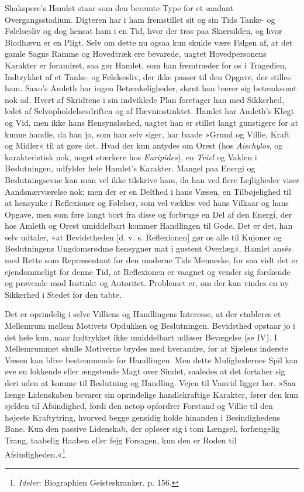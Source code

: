 \documentclass[12pt,a4paper,openany]{book}
\newcommand{\opage}[1]{\marginnote{\footnotesize\textit{[#1]}}}
\begin{document}
Shakspere’s Hamlet staar som den berømte Type for et saadant
Overgangsstadium. Digteren har i ham fremstillet sit og sin Tids Tanke-
og Følelsesliv og dog hensat ham i en Tid, hvor der tros paa Skærsilden,
og hvor Blodhævn er en Pligt.
\opage{393}Selv om dette nu ogsaa kun skulde være Følgen af, at det
gamle Sagns Ramme og Hovedtræk ere bevarede, uagtet Hovedpersonens
Karakter er forandret, saa gør Hamlet, som han fremtræder for os i
Tragedien, Indtrykket af et Tanke- og Følelsesliv, der ikke passer til
den Opgave, der stilles ham. Saxo’s Amleth har ingen Betænkeligheder,
skønt han bærer sig betænksomt nok ad. Hvert af Skridtene i sin
indviklede Plan foretager han med Sikkerhed, ledet af
Selvopholdelsesdriften og af Hævninstinktet. Hamlet har Amleth’s Kløgt
og Vid, men ikke hans Hensynsløshed, uagtet han er stillet langt
gunstigere for at kunne handle, da han jo, som han selv siger, har baade
»Grund og Villie, Kraft og Midler« til at gøre det. Hvad der kun antydes
om Orest (hos \emph{Aischylos}, og karakteristisk nok, noget stærkere
hos \emph{Euripides}), en \emph{Tvivl} og Vaklen i Beslutningen,
udfylder hele Hamlet’s Karakter. Mangel paa Energi og Beslutningsevne
kan man vel ikke tilskrive ham, da han ved flere Lejligheder viser
Aandsnærværelse nok; men der er en Delthed i hans Væsen, en
Tilbøjelighed til at hensynke i Reflexioner og Følelser, som vel vækkes
ved hans Vilkaar og hans Opgave, men som føre langt bort fra disse og
forbruge en Del af den Energi, der hos Amleth og Orest umiddelbart
kommer Handlingen til Gode. Det er det, han selv udtaler, »at
Bevidstheden [d. v. s. Reflexionen] gør os alle til Kujoner og
Beslutningens Ungdomsrødme hensygner mat i gustent Overlæg«. Hamlet
ansés med Rette som Repræsentant for den moderne Tids Menneske, for saa
vidt det er ejendommeligt for denne Tid, at Reflexionen er vaagnet og
vender sig forskende og prøvende mod Instinkt og Autoritet. Problemet
er, om der kan vindes en ny Sikkerhed i Stedet for den tabte.

Det er oprindelig i selve Villiens og Handlingens Interesse, at der
etableres et Mellemrum mellem Motivets Opdukken og Beslutningen.
Bevidsthed opstaar jo i det hele kun, naar Indtrykket ikke umiddelbart
udløser Bevægelse (se IV). I Mellemrummet skulle Motiverne brydes med
hverandre, for at Sjælens inderste Væsen kan blive bestemmende for
Handlingen. Men dette Mulighedernes Spil kan øve en lokkende eller
ængstende Magt over Sindet, saaledes at det fortaber sig deri uden at
komme til Beslutning og Handling. Vejen til Vanvid ligger her. »Saa
længe Lidenskaben bevarer sin
\opage{394}oprindelige handlekraftige Karakter, fører den kun sjelden
til Afsindighed, fordi den netop opfordrer Forstand og Villie til den
højeste Kraftytring, hvorved begge gensidig holde hinanden i
Besindighedens Bane. Kun den passive Lidenskab, der opløser sig i tom
Længsel, forfængelig Trang, taabelig Haaben eller fejg Forsagen, kun den
er Roden til Afsindigheden.«\footnote[1]{\emph{Ideler}: Biographien
Geisteskranker. p. 156.}
\end{document}
